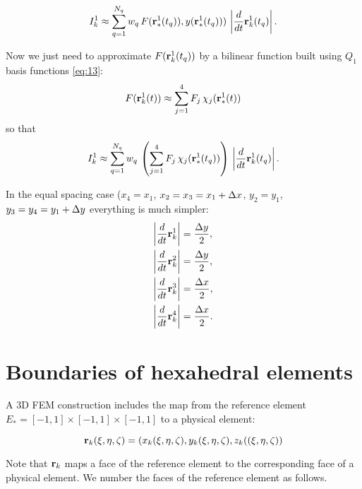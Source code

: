 \documentclass[11pt]{article}
\begin{document}
\begin{equation}
\label{eq:16}
I_{k}^{1} \approx \sum_{q=1}^{N_{q}} w_{q}\, F(\mathbf{r}_{*}^{1}(t_{q})), y(\mathbf{r}_{*}^{1}(t_{q})))\, \left|\frac{d}{dt}\mathbf{r}_{k}^{1}(t_{q}) \right|.
\end{equation}

Now we just need to approximate $F(\mathbf{r}_{k}^{1}(t_{q}))$ by
a bilinear function built using $Q_{1}$ basis functions \eqref{eq:13}:
\begin{equation}
\label{eq:17}
F(\mathbf{r}_{k}^{1}(t)) \approx \sum_{j=1}^{4} F_{j}\, \chi_{j}(\mathbf{r}_{*}^{1}(t))
\end{equation}
so that
\begin{equation}
\label{eq:18}
I_{k}^{1} \approx \sum_{q=1}^{N_{q}} w_{q}\,
\left( \sum_{j=1}^{4} F_{j}\, \chi_{j}(\mathbf{r}_{*}^{1}(t_{q})) \right) \, \left| \frac{d}{dt}\mathbf{r}_{k}^{1}(t_{q}) \right|.
\end{equation}

In the equal spacing case ($x_{4} = x_{1}$, $x_{2} = x_{3} = x_{1} +
\Delta x$, $y_{2} = y_{1}$, $y_{3} = y_{4} = y_{1} + \Delta y$ everything is much simpler:
\begin{align*}
\left| \frac{d}{dt}\mathbf{r}_{k}^{1}\right|  & = \frac{\Delta y}{2}, \\
\left| \frac{d}{dt}\mathbf{r}_{k}^{2}\right|  & = \frac{\Delta y}{2}, \\
\left| \frac{d}{dt}\mathbf{r}_{k}^{3}\right|  & = \frac{\Delta x}{2}, \\
\left| \frac{d}{dt}\mathbf{r}_{k}^{4}\right|  & = \frac{\Delta x}{2}. \\
\end{align*}

\section{Boundaries of hexahedral elements}
\label{sec-4}

A 3D FEM construction includes the map from the reference element
$E_{*} = [-1, 1] \times [-1,1] \times [-1,1]$ to a physical element:

\begin{equation}
\label{eq:19}
\mathbf{r}_{k}(\xi,\eta,\zeta) = \left( x_{k}(\xi,\eta,\zeta), y_{k}(\xi,\eta,\zeta), z_{k}((\xi,\eta,\zeta) \right)
\end{equation}

Note that $\mathbf{r}_{k}$ maps a face of the reference element to the
corresponding face of a physical element. We number the faces of the
reference element as follows.
\end{document}
